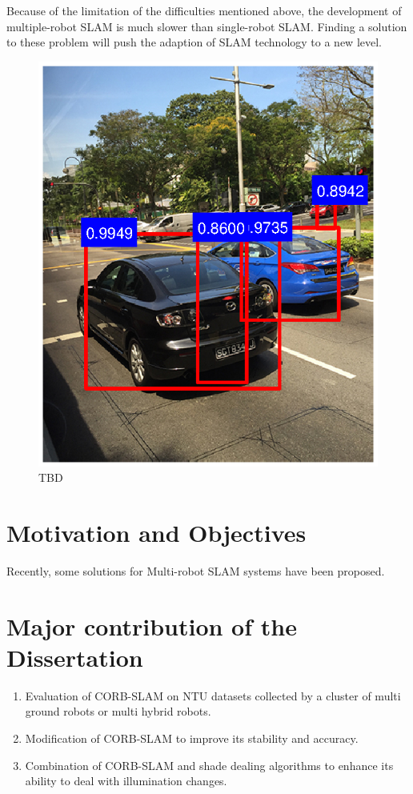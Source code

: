 Because of the limitation of the difficulties mentioned above, the development of multiple-robot SLAM is much slower than single-robot SLAM. Finding a solution to these problem will push the adaption of SLAM technology to a new level.

\begin{figure}[H]
\centering
\includegraphics[width=5in]{Chapter1/boundingbox.eps}
\caption{TBD}
\label{fig:boundingboxexample} 
\end{figure}


\section{Motivation and Objectives}

Recently, some solutions for Multi-robot SLAM systems have been proposed.\cite{mcmanus2014shady}




\section{Major contribution of the Dissertation}
\begin{enumerate}[1.]
	\item Evaluation of CORB-SLAM on NTU datasets collected by a cluster of multi ground robots or multi hybrid robots.
	\item Modification of CORB-SLAM to improve its stability and accuracy.
	\item Combination of CORB-SLAM and shade dealing algorithms to enhance its ability to deal with illumination changes.
\end{enumerate}


